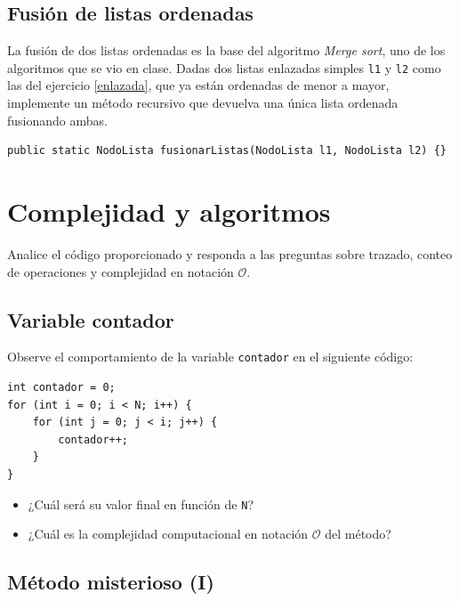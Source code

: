 \documentclass[a4paper]{article}
\newcommand{\code}[1]{\texttt{#1}}
\newcommand{\bigO}{\mathcal{O}}
\begin{document}
\subsection{Fusión de listas ordenadas}

La fusión de dos listas ordenadas es la base del algoritmo \textit{Merge sort}, uno de los algoritmos que se vio en clase. Dadas dos listas enlazadas simples \code{l1} y \code{l2} como las del ejercicio \ref{enlazada}, que ya están ordenadas de menor a mayor, implemente un método recursivo que devuelva una única lista ordenada fusionando ambas.

\begin{verbatim}
public static NodoLista fusionarListas(NodoLista l1, NodoLista l2) {}
\end{verbatim}

\section{Complejidad y algoritmos}

Analice el código proporcionado y responda a las preguntas sobre trazado, conteo de operaciones y complejidad en notación $\bigO$.

\subsection{Variable contador}

Observe el comportamiento de la variable \code{contador} en el siguiente código:

\begin{verbatim}
int contador = 0;
for (int i = 0; i < N; i++) {
    for (int j = 0; j < i; j++) {
        contador++;
    }
}
\end{verbatim}

\begin{itemize}
    \item ¿Cuál será su valor final en función de \code{N}?
    \item ¿Cuál es la complejidad computacional en notación $\bigO$ del método?
\end{itemize}

\subsection{Método misterioso (I)}
\end{document}
